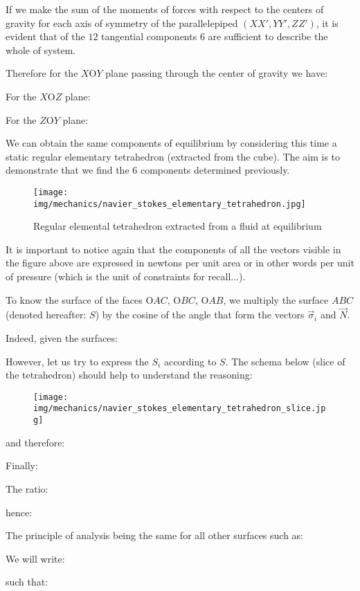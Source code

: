 	If we make the sum of the moments of forces with respect to the centers of gravity for each axis of symmetry of the parallelepiped $(XX', YY', ZZ')$, it is evident that of the $12$ tangential components $6$ are sufficient to describe the whole of system.
	
	Therefore for the $X$O$Y$ plane passing through the center of gravity we have:
	
	For the $X$O$Z$ plane:
	
	For the $Z$O$Y$ plane:
	
	We can obtain the same components of equilibrium  by considering this time a static regular elementary tetrahedron (extracted from the cube). The aim is to demonstrate that we find the $6$ components determined previously.
	\begin{figure}[H]
		\centering
		\texttt{[image: img/mechanics/navier\_stokes\_elementary\_tetrahedron.jpg]}
		\caption{Regular elemental tetrahedron extracted from a fluid at equilibrium}
	\end{figure}
	\begin{tcolorbox}[title=Remark,colframe=black,arc=10pt]
	It is important to notice again that the components of all the vectors visible in the figure above are expressed in newtons per unit area or in other words per unit of pressure (which is the unit of constraints for recall...).
	\end{tcolorbox}
	To know the surface of the faces O$AC$, O$BC$, O$AB$, we multiply the surface $ABC$ (denoted hereafter: $S$) by the cosine of the angle that form the vectors $\vec{\sigma}_i$ and $\vec{N}$.

	Indeed, given the surfaces:
	
	However, let us try to express the $S_i$ according to $S$. The schema below (slice of the tetrahedron) should help to understand the reasoning:
	
	\begin{figure}[H]
		\centering
		\texttt{[image: img/mechanics/navier\_stokes\_elementary\_tetrahedron\_slice.jpg]}
	\end{figure}
	and therefore:
	
	Finally:
	
	The ratio:
	
	hence:
	
	The principle of analysis being the same for all other surfaces such as:
	
	We will write:
	
	such that:
	
